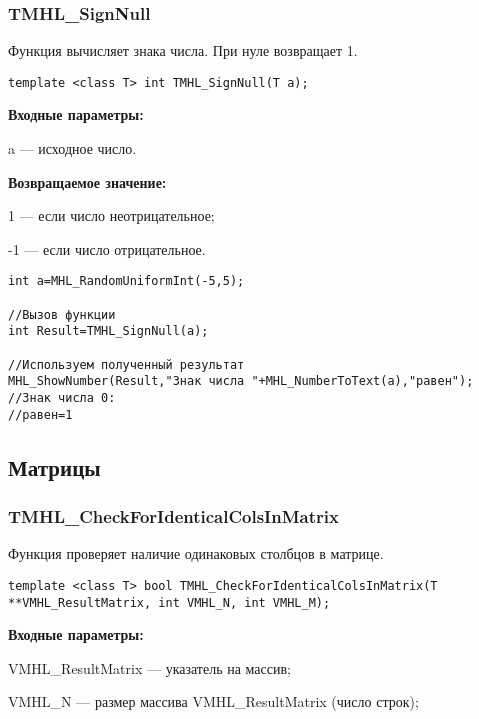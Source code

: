 \documentclass[a4paper,12pt]{article}
\begin{document}
\subsubsection{TMHL\_SignNull}\label{TMHL_SignNull}

Функция вычисляет знака числа. При нуле возвращает 1.


\begin{lstlisting}[label=code_syntax_TMHL_SignNull,caption=Синтаксис]
template <class T> int TMHL_SignNull(T a);
\end{lstlisting}

\textbf{Входные параметры:}

 a --- исходное число.

\textbf{Возвращаемое значение:}

 1 --- если число неотрицательное;
 
 -1 --- если число отрицательное.


\begin{lstlisting}[label=code_use_TMHL_SignNull,caption=Пример использования]
int a=MHL_RandomUniformInt(-5,5);

//Вызов функции
int Result=TMHL_SignNull(a);

//Используем полученный результат
MHL_ShowNumber(Result,"Знак числа "+MHL_NumberToText(a),"равен");
//Знак числа 0:
//равен=1
\end{lstlisting}

\subsection{Матрицы}

\subsubsection{TMHL\_CheckForIdenticalColsInMatrix}\label{TMHL_CheckForIdenticalColsInMatrix}

Функция проверяет наличие одинаковых столбцов в матрице.


\begin{lstlisting}[label=code_syntax_TMHL_CheckForIdenticalColsInMatrix,caption=Синтаксис]
template <class T> bool TMHL_CheckForIdenticalColsInMatrix(T **VMHL_ResultMatrix, int VMHL_N, int VMHL_M);
\end{lstlisting}

\textbf{Входные параметры:}
 
VMHL\_ResultMatrix --- указатель на массив;
 
VMHL\_N --- размер массива VMHL\_ResultMatrix (число строк);
 
\end{document}
